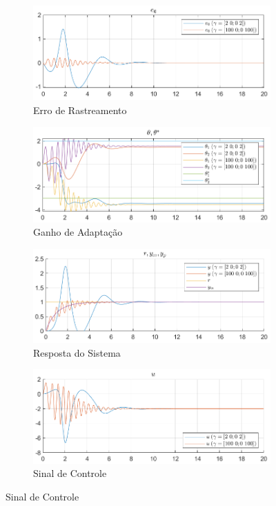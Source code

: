 \documentclass[10pt]{article}
\begin{document}
\begin{figure}[h!]
    \centering
    \begin{subfigure}[b]{0.35\textwidth}
        \centering
        \includegraphics[width=\textwidth]{img/fig07a.png}
        \caption{Erro de Rastreamento}
    \end{subfigure}
    \begin{subfigure}[b]{0.35\textwidth}
        \centering
        \includegraphics[width=\textwidth]{img/fig07b.png}
        \caption{Ganho de Adaptação}
    \end{subfigure}

    \begin{subfigure}[b]{0.35\textwidth}
        \centering
        \includegraphics[width=\textwidth]{img/fig07c.png}
        \caption{Resposta do Sistema}
    \end{subfigure}
    \begin{subfigure}[b]{0.35\textwidth}
        \centering
        \includegraphics[width=\textwidth]{img/fig07e.png}
        \caption{Sinal de Controle}
    \end{subfigure}


\end{figure}
\end{document}
